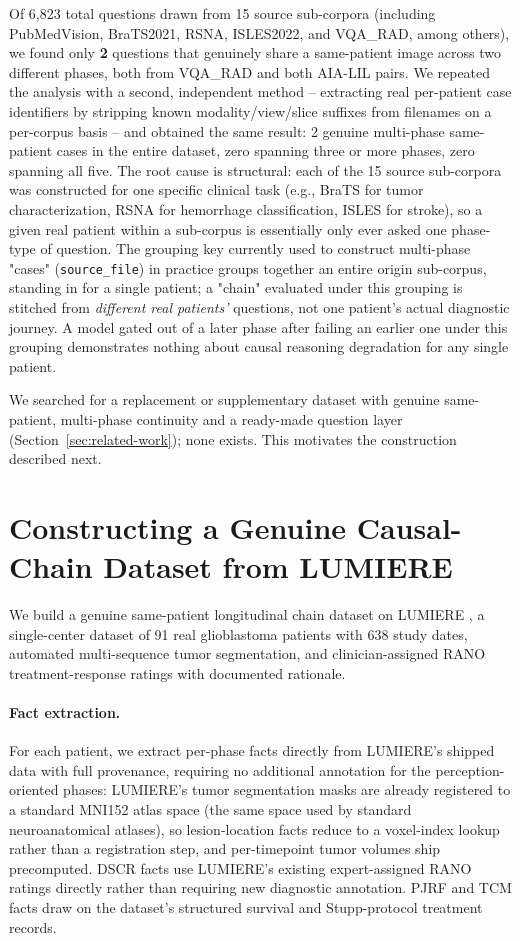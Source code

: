 \documentclass[11pt]{article}
\begin{document}
Of 6,823 total questions drawn from 15 source sub-corpora (including PubMedVision, BraTS2021, RSNA, ISLES2022, and VQA\_RAD, among others), we found only \textbf{2} questions that genuinely share a same-patient image across two different phases, both from VQA\_RAD and both AIA-LIL pairs. We repeated the analysis with a second, independent method -- extracting real per-patient case identifiers by stripping known modality/view/slice suffixes from filenames on a per-corpus basis -- and obtained the same result: 2 genuine multi-phase same-patient cases in the entire dataset, zero spanning three or more phases, zero spanning all five. The root cause is structural: each of the 15 source sub-corpora was constructed for one specific clinical task (e.g., BraTS for tumor characterization, RSNA for hemorrhage classification, ISLES for stroke), so a given real patient within a sub-corpus is essentially only ever asked one phase-type of question. The grouping key currently used to construct multi-phase "cases" (\texttt{source\_file}) in practice groups together an entire origin sub-corpus, standing in for a single patient; a "chain" evaluated under this grouping is stitched from \emph{different real patients'} questions, not one patient's actual diagnostic journey. A model gated out of a later phase after failing an earlier one under this grouping demonstrates nothing about causal reasoning degradation for any single patient.

We searched for a replacement or supplementary dataset with genuine same-patient, multi-phase continuity and a ready-made question layer (Section~\ref{sec:related-work}); none exists. This motivates the construction described next.

\section{Constructing a Genuine Causal-Chain Dataset from LUMIERE}
\label{sec:lumiere}

We build a genuine same-patient longitudinal chain dataset on LUMIERE \citep{suter2022lumiere}, a single-center dataset of 91 real glioblastoma patients with 638 study dates, automated multi-sequence tumor segmentation, and clinician-assigned RANO treatment-response ratings with documented rationale.

\paragraph{Fact extraction.} For each patient, we extract per-phase facts directly from LUMIERE's shipped data with full provenance, requiring no additional annotation for the perception-oriented phases: LUMIERE's tumor segmentation masks are already registered to a standard MNI152 atlas space (the same space used by standard neuroanatomical atlases), so lesion-location facts reduce to a voxel-index lookup rather than a registration step, and per-timepoint tumor volumes ship precomputed. DSCR facts use LUMIERE's existing expert-assigned RANO ratings directly rather than requiring new diagnostic annotation. PJRF and TCM facts draw on the dataset's structured survival and Stupp-protocol treatment records.
\end{document}
